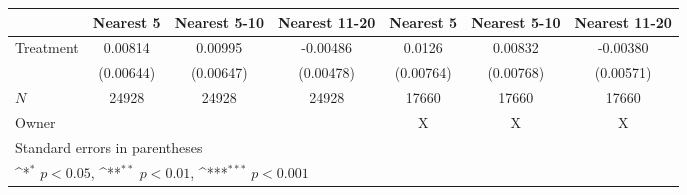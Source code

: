 {
\def\sym#1{\ifmmode^{#1}\else\(^{#1}\)\fi}
\begin{tabular}{l*{6}{c}}
\hline\hline
            &\multicolumn{1}{c}{Nearest 5}&\multicolumn{1}{c}{Nearest 5-10}&\multicolumn{1}{c}{Nearest 11-20}&\multicolumn{1}{c}{Nearest 5}&\multicolumn{1}{c}{Nearest 5-10}&\multicolumn{1}{c}{Nearest 11-20}\\
\hline
Treatment   &     0.00814         &     0.00995         &    -0.00486         &      0.0126         &     0.00832         &    -0.00380         \\
            &   (0.00644)         &   (0.00647)         &   (0.00478)         &   (0.00764)         &   (0.00768)         &   (0.00571)         \\
\hline
\(N\)       &       24928         &       24928         &       24928         &       17660         &       17660         &       17660         \\
Owner       &                     &                     &                     &           X         &           X         &           X         \\
\hline\hline
\multicolumn{7}{l}{\footnotesize Standard errors in parentheses}\\
\multicolumn{7}{l}{\footnotesize \sym{*} \(p<0.05\), \sym{**} \(p<0.01\), \sym{***} \(p<0.001\)}\\
\end{tabular}
}
